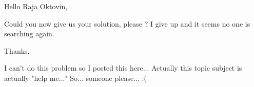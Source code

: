 \begin{solution}
	Hello Raja Oktovin,

Could you now give us your solution, please ?
I give up and it seems no one is searching again.

Thanks.
\end{solution}



\begin{solution}
	I can't do this problem so I posted this here...
Actually this topic subject is actually "help me..." 
So... someone please...  :(
\end{solution}



